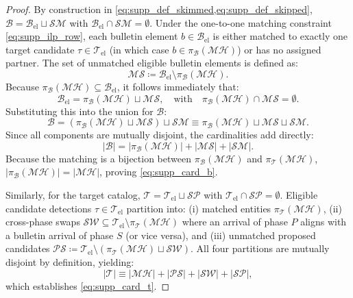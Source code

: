 \begin{proof}
  By construction in \cref{eq:supp_def_skimmed,eq:supp_def_skipped},
  $\mathcal{B} = \mathcal{B}_{\mathrm{el}} \sqcup \mathcal{SM}$ with
  $\mathcal{B}_{\mathrm{el}} \cap \mathcal{SM} = \emptyset$.
  Under the one-to-one matching constraint \cref{eq:supp_ilp_row},
  each bulletin element
  $b \in \mathcal{B}_{\mathrm{el}}$ is either matched to exactly one
  target candidate
  $\tau \in \mathcal{T}_{\mathrm{el}}$ (in which case $b \in
  \pi_{\mathcal{B}}(\mathcal{MH})$)
  or has no assigned partner. The set of unmatched eligible bulletin
  elements is defined as:
  \begin{equation}
    \mathcal{MS} \coloneqq \mathcal{B}_{\mathrm{el}} \setminus
    \pi_{\mathcal{B}}(\mathcal{MH}).
  \end{equation}
  Because $\pi_{\mathcal{B}}(\mathcal{MH}) \subseteq
  \mathcal{B}_{\mathrm{el}}$, it follows immediately that:
  \begin{equation}
    \mathcal{B}_{\mathrm{el}} = \pi_{\mathcal{B}}(\mathcal{MH})
    \sqcup \mathcal{MS},
    \quad \text{with} \quad \pi_{\mathcal{B}}(\mathcal{MH}) \cap
    \mathcal{MS} = \emptyset.
  \end{equation}
  Substituting this into the union for $\mathcal{B}$:
  \begin{equation}
    \mathcal{B} = \left(\pi_{\mathcal{B}}(\mathcal{MH}) \sqcup
    \mathcal{MS}\right) \sqcup \mathcal{SM}
    \equiv \pi_{\mathcal{B}}(\mathcal{MH}) \sqcup \mathcal{MS}
    \sqcup \mathcal{SM}.
  \end{equation}
  Since all components are mutually disjoint, the cardinalities add directly:
  \begin{equation}
    |\mathcal{B}| = |\pi_{\mathcal{B}}(\mathcal{MH})| +
    |\mathcal{MS}| + |\mathcal{SM}|.
  \end{equation}
  Because the matching is a bijection between
  $\pi_{\mathcal{B}}(\mathcal{MH})$ and
  $\pi_{\mathcal{T}}(\mathcal{MH})$,
  $|\pi_{\mathcal{B}}(\mathcal{MH})| = |\mathcal{MH}|$,
  proving \cref{eq:supp_card_b}.

  Similarly, for the target catalog, $\mathcal{T} =
  \mathcal{T}_{\mathrm{el}} \sqcup \mathcal{SP}$
  with $\mathcal{T}_{\mathrm{el}} \cap \mathcal{SP} = \emptyset$.
  Eligible candidate detections $\tau \in \mathcal{T}_{\mathrm{el}}$
  partition into:
  (i) matched entities $\pi_{\mathcal{T}}(\mathcal{MH})$,
  (ii) cross-phase swaps $\mathcal{SW} \subseteq
  \mathcal{T}_{\mathrm{el}} \setminus \pi_{\mathcal{T}}(\mathcal{MH})$
  where an arrival of phase $P$ aligns with a bulletin arrival of
  phase $S$ (or vice versa), and
  (iii) unmatched proposed candidates $\mathcal{PS} \coloneqq
  \mathcal{T}_{\mathrm{el}} \setminus
  (\pi_{\mathcal{T}}(\mathcal{MH}) \sqcup \mathcal{SW})$.
  All four partitions are mutually disjoint by definition, yielding:
  \begin{equation}
    |\mathcal{T}| \equiv |\mathcal{MH}| + |\mathcal{PS}| +
    |\mathcal{SW}| + |\mathcal{SP}|,
  \end{equation}
  which establishes \cref{eq:supp_card_t}.
\end{proof}


